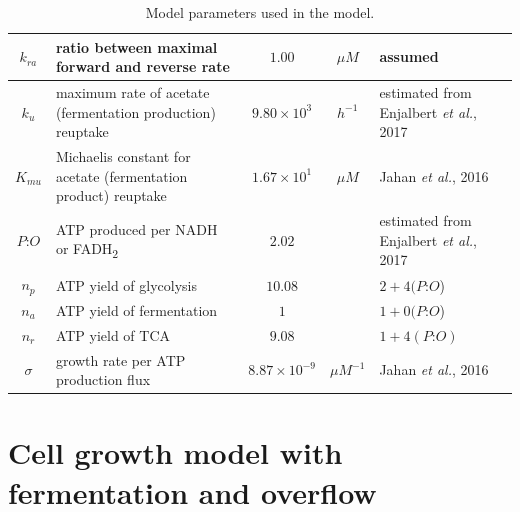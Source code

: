 \documentclass[11pt]{article}
\begin{document}
{\begin{table}[!htbp]
\begin{tabular}{|c|l|c|c|l|}
 $k_{ra}$ & ratio between maximal forward and reverse rate & $1.00$ & $\mu M$ & assumed \\ \hline
 $k_u$ & maximum rate of acetate (fermentation production) reuptake & $9.80\times 10^3$ &  $h^{-1}$ & estimated from Enjalbert \textit{et al.}, 2017 \\ \hline
 $K_{mu}$ & Michaelis constant for acetate (fermentation product) reuptake & $1.67\times 10^{1}$ & $\mu M$ & Jahan \textit{et al.}, 2016\\ \hline
 $P\mathord{:}O$ & ATP produced per NADH or FADH\textsubscript{2} & $2.02$  & & estimated from Enjalbert \textit{et al.}, 2017 \\ \hline
 $n_p$ & ATP yield of glycolysis & $10.08$ & & $2+4(P\mathord{:}O$)  \\ \hline
 $n_a$ & ATP yield of fermentation & $1$ & & $1+0(P\mathord{:}O$)\\ \hline
 $n_r$ & ATP yield of TCA & $9.08$ & & $1+4(P\mathord{:}O)$ \\ \hline
 $\sigma$  & growth rate per ATP production flux & $8.87\times 10^{-9}$ & $\mu M^{-1}$ & Jahan \textit{et al.}, 2016 \\ \hline
\end{tabular}
\caption{Model parameters used in the model.}
\label{tab:parameters}
\end{table}
\normalsize
  
  
  
\section{Cell growth model with fermentation and overflow}

}
\end{document}

